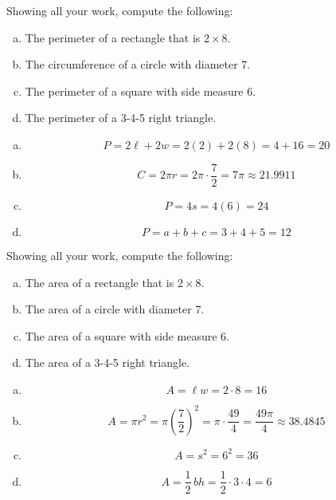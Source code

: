 \documentclass[11pt,letterpaper]{article}
\begin{document}

 Showing all your work, compute the following:
	\begin{enumerate}[(a)]
	\item The perimeter of a rectangle that is $2 \times 8$.
	\item The circumference of a circle with diameter 7.
	\item The perimeter of a square with side measure 6.
	\item The perimeter of a 3-4-5 right triangle. 
	\end{enumerate} \pspace

\sol 
\begin{enumerate}[(a)]
\item 
	\[
	P= 2\ell + 2w= 2(2) + 2(8)= 4 + 16= 20 
	\] \pspace

\item 
	\[
	C= 2 \pi r= 2 \pi \cdot \dfrac{7}{2}= 7\pi \approx 21.9911
	\] \pspace

\item 
	\[
	P= 4s= 4(6)= 24 
	\] \pspace

\item 
	\[
	P= a + b + c= 3 + 4 + 5= 12
	\]
\end{enumerate}



\newpage



 Showing all your work, compute the following:
	\begin{enumerate}[(a)]
	\item The area of a rectangle that is $2 \times 8$.
	\item The area of a circle with diameter 7.
	\item The area of a square with side measure 6.
	\item The area of a 3-4-5 right triangle. 
	\end{enumerate} \pspace

\sol 
\begin{enumerate}[(a)]
\item 
	\[
	A= \ell w= 2 \cdot 8= 16
	\] \pspace

\item 
	\[
	A= \pi r^2= \pi \left( \dfrac{7}{2} \right)^2= \pi \cdot \dfrac{49}{4}= \dfrac{49\pi}{4} \approx 38.4845
	\] \pspace

\item 
	\[
	A= s^2= 6^2= 36
	\] \pspace

\item 
	\[
	A= \frac{1}{2} \,bh= \frac{1}{2} \cdot 3 \cdot 4= 6
	\]
\end{enumerate}
\end{document}
